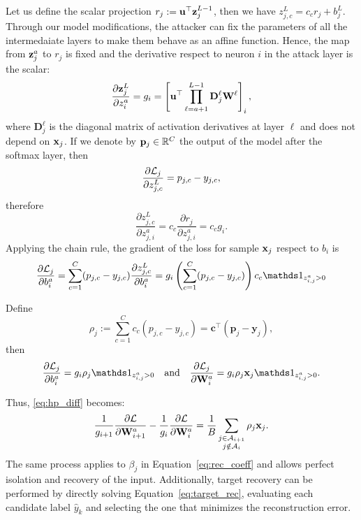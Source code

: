 Let us define the scalar projection $r_j := \mathbf{u}^{\top}{\mathbf{z}}^{L-1}_j$, then we have $z_{j,c}^L=c_cr_j+b_j^L$.
Through our model modifications, the attacker can fix the parameters of all the intermedaiate layers to make them behave as an affine function. Hence, the map from ${\mathbf{z}}_j^a$ to $r_j$ is fixed and the derivative respect to neuron $i$ in the attack layer is the scalar:
\begin{equation}
    \frac{\partial {\mathbf{z}}^L_j}{\partial z_i^a}=g_i = \left[\mathbf{u}^{\top}\prod_{\ell=a+1}^{L-1}\mathbf{D}_j^{\ell}\mathbf{W}^{\ell} \right]_i,
\end{equation}
where  $\mathbf{D}_j^{\ell}$ is the diagonal matrix of activation derivatives at layer $\ell$ and does not depend on ${\mathbf{x}}_j$. If we denote by $\mathbf{p}_j \in \mathbb{R}^C$ the output of the model after the softmax layer, then
\begin{equation}
    \frac{\partial \mathcal{L}_j}{\partial z_{j,c}^{L}} = p_{j,c}-y_{j,c},
\end{equation}
therefore
\begin{equation}
    \frac{\partial z_{j,c}^{L}}{\partial z_{j,i}^a} = c_c \frac{\partial r_j}{\partial z_{j,i}^a}= c_c g_i.
\end{equation}
Applying the chain rule, the gradient of the loss for sample ${\mathbf{x}}_j$ respect to $b_i$ is
\begin{equation}
    \frac{\partial \loss_j}{\partial b_i^a}
    =
    \sum_{c=1}^C
    (p_{j,c}-y_{j,c})
    \frac{\partial z_{j,c}^{L}}{\partial b_i^a} = g_i  \left( \sum_{c=1}^C (p_{j,c}-y_{j,c}) \right ) c_c  \indicator_{z_{i,j}^a>0}
\end{equation}

Define
\begin{equation} \rho_j:=\sum_{c=1}^C c_c(p_{j,c}-y_{j,c})=\mathbf{c}^{\top}(\mathbf{p}_j-\mathbf{y}_j), 
\end{equation}
then
\begin{equation}
    \frac{\partial \loss_j}{\partial b_i^a}=g_i\rho_j\indicator_{z_{i,j}^a>0} \quad \mathrm{and} \quad \frac{\partial \loss_j}{\partial \W_i^a}=g_i\rho_j\x_j\indicator_{z_{i,j}^a>0}.
\end{equation}

Thus, \eqref{eq:hp_diff} becomes:
\begin{equation}
    \frac{1}{g_{i+1}}\frac{\partial \mathcal{L}}{\partial \mathbf{W}_{i+1}^a}-\frac{1}{g_i}\frac{\partial \mathcal{L}}{\partial \mathbf{W}_i^a}=\frac{1}{B}\sum_{\substack{j\in\mathcal{A}_{i+1}\\j\notin\mathcal{A}_i}} \rho_j{\mathbf{x}}_j.
\end{equation}
The same process applies to $\beta_j$ in Equation~\eqref{eq:rec_coeff} and allows perfect isolation and recovery of the input. Additionally, target recovery can be performed by directly solving Equation~\eqref{eq:target_rec}, evaluating each candidate label $\hat{y}_k$ and selecting the one that minimizes the reconstruction error.

